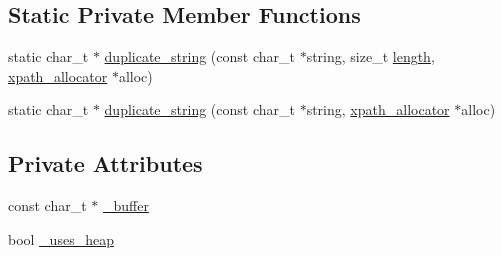 \subsection*{Static Private Member Functions}
\begin{DoxyCompactItemize}
\item 
static char\-\_\-t $\ast$ \hyperlink{classxpath__string_a57c53a0b67fecb1845c31215d8ee206b}{duplicate\-\_\-string} (const char\-\_\-t $\ast$string, size\-\_\-t \hyperlink{classxpath__string_a1238d6fdad0766a21965cfeb668f5a5b}{length}, \hyperlink{classxpath__allocator}{xpath\-\_\-allocator} $\ast$alloc)
\item 
static char\-\_\-t $\ast$ \hyperlink{classxpath__string_a8e1458ed23ff94c0c27f8eb96fb26b11}{duplicate\-\_\-string} (const char\-\_\-t $\ast$string, \hyperlink{classxpath__allocator}{xpath\-\_\-allocator} $\ast$alloc)
\end{DoxyCompactItemize}
\subsection*{Private Attributes}
\begin{DoxyCompactItemize}
\item 
const char\-\_\-t $\ast$ \hyperlink{classxpath__string_ad52a80412797ca64bbd1bff527e9d666}{\-\_\-buffer}
\item 
bool \hyperlink{classxpath__string_a67a86f6d1a9cf20b922fc9fb1268d4c1}{\-\_\-uses\-\_\-heap}
\end{DoxyCompactItemize}


